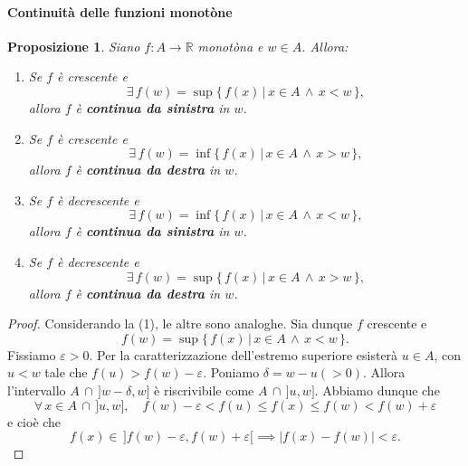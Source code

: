 \documentclass{article}
\theoremstyle{plain}
\newtheorem{prop}[thm]{Proposizione}
\theoremstyle{definition}
\theoremstyle{remark}
\begin{document}
\vspace{10pt}

\paragraph{Continuità delle funzioni monotòne}
\begin{bxthm}
\begin{prop}
    Siano $f:A\to\mathbb{R}$ monotòna e $w\in A$. Allora:\\
    \begin{enumerate}
        \item Se $f$ è crescente e \[\exists\,f(w)=\sup\{\,f(x)\,|\,x\in A\,\land\, x<w\,\},\] allora $f$ è \textbf{continua da sinistra} in $w$.\\
        \item Se $f$ è crescente e \[\exists\,f(w)=\inf\{\,f(x)\,|\,x\in A\,\land\, x>w\,\},\] allora $f$ è \textbf{continua da destra} in $w$.\\
        \item Se $f$ è decrescente e \[\exists\,f(w)=\inf\{\,f(x)\,|\,x\in A\,\land\, x<w\,\},\] allora $f$ è \textbf{continua da sinistra} in $w$.\\
        \item Se $f$ è decrescente e \[\exists\,f(w)=\sup\{\,f(x)\,|\,x\in A\,\land\, x>w\,\},\] allora $f$ è \textbf{continua da destra} in $w$.\\
    \end{enumerate}
\end{prop}
\end{bxthm}
\begin{proof}
    Considerando la (1), le altre sono analoghe.
    Sia dunque $f$ crescente e \[f(w)=\sup\{\,f(x)\,|\,x\in A\,\land\, x<w\,\}.\]
    Fissiamo $\varepsilon>0$.
    Per la caratterizzazione dell'estremo superiore esisterà $u\in A$, con $u<w$ tale che $f(u)>f(w)-\varepsilon$. 
    Poniamo $\delta=w-u(>0)$.
    Allora l'intervallo $A\,\cap\,]w-\delta,w]$ è riscrivibile come $A\,\cap\,]u,w]$.
    Abbiamo dunque che \[\forall\, x\in A\,\cap\,]u,w],\quad f(w)-\varepsilon<f(u)\leq f(x)\leq f(w)<f(w)+\varepsilon\] 
    e cioè che \[f(x)\in\,]f(w)-\varepsilon,f(w)+\varepsilon[\implies |f(x)-f(w)|<\varepsilon.\]
\end{proof}

\vspace{10pt}
\end{document}
